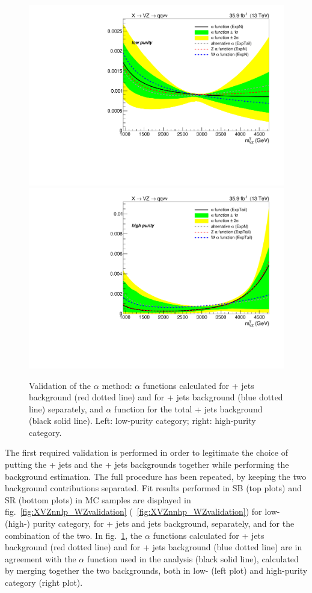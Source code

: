 \begin{figure}[!htb]
  \centering
    \includegraphics[width=.495\textwidth]{plotsAlpha_tesi/XVZnnlp/FourAlphaRatio.pdf}
    \includegraphics[width=.495\textwidth]{plotsAlpha_tesi/XVZnnhp/FourAlphaRatio.pdf}
  \caption{Validation of the $\alpha$ method: $\alpha$ functions calculated for \Z + jets background (red dotted line) and for \W + jets background (blue dotted line) separately, and $\alpha$ function for the total \V + jets background (black solid line). Left: low-purity category; right: high-purity category.}
  \label{fig:XVZnn_WZvalidation}
\end{figure}

The first required validation is performed in order to legitimate the choice of putting the \Z + jets and the \W + jets backgrounds together while performing the background estimation. The full procedure has been repeated, by keeping the two background contributions separated. Fit results performed in SB (top plots) and SR (bottom plots) in MC samples are displayed in fig.~\ref{fig:XVZnnlp_WZvalidation} (~\ref{fig:XVZnnhp_WZvalidation}) for low- (high-) purity category, for \Z + jets and \W jets background, separately, and for the combination of the two. In fig.~\ref{fig:XVZnn_WZvalidation}, the $\alpha$ functions calculated for \Z + jets background (red dotted line) and for \W + jets background (blue dotted line) are in agreement with the $\alpha$ function used in the analysis (black solid line), calculated by merging together the two backgrounds, both in low- (left plot) and high-purity category (right plot).


